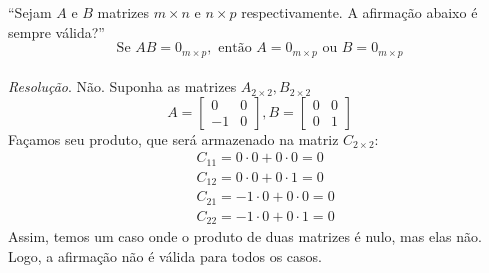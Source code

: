 \enquote{Sejam $A$ e $B$ matrizes $m \times n$ e $n \times p$ respectivamente. A afirmação abaixo é sempre válida?}
\begin{displaymath}
    \text{Se } AB = 0_{m\times p}, \text{ então } A = 0_{m\times p} \text{ ou }
    B = 0_{m\times p}
\end{displaymath}
\\ 
\emph{Resolução}. Não. Suponha as matrizes $A_{2\times2}, B_{2\times2}$
\begin{displaymath}
    A = \left[\begin{array}{cc} 0 & 0 \\ -1 & 0 \end{array}\right],
    B = \left[\begin{array}{cc} 0 & 0 \\ 0 & 1 \end{array}\right]
\end{displaymath}
Façamos seu produto, que será armazenado na matriz $C_{2\times2}$:
\begin{align*}
    &C_{11} = 0\cdot0 + 0 \cdot 0 = 0 \\
    &C_{12} = 0 \cdot 0 + 0 \cdot 1 = 0 \\
    &C_{21} = -1 \cdot 0 + 0 \cdot 0 = 0 \\
    &C_{22} = -1\cdot 0 + 0 \cdot 1 = 0
\end{align*}
Assim, temos um caso onde o produto de duas matrizes é nulo, mas elas não. Logo, a afirmação não é válida para todos os casos.